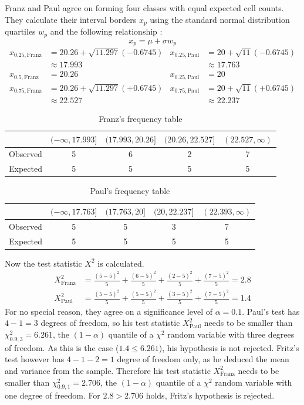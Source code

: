\documentclass{article}
\begin{document}
Franz and Paul agree on forming four classes with equal expected cell counts.
They calculate their interval borders $x_p$ using the standard normal distribution quartiles $w_p$ and the following relationship \cite{conover1980practical}:
\begin{equation*}
	x_p = \mu + \sigma w_p
\end{equation*}
%
\begin{align*}
	x_{0.25, \text{Franz}} &= 20.26 + \sqrt{11.297}(-0.6745) & x_{0.25, \text{Paul}} &= 20 + \sqrt{11}(-0.6745) \\
	&\approx 17.993 & &\approx 17.763 \\[1ex]
	x_{0.5, \text{Franz}} &= 20.26 & x_{0.25, \text{Paul}} &= 20 \\[1ex]
	x_{0.75, \text{Franz}} &= 20.26 + \sqrt{11.297}(+0.6745) & x_{0.75, \text{Paul}} &= 20 + \sqrt{11}(+0.6745) \\
	&\approx 22.527 & &\approx 22.237
\end{align*}
%
\begin{table}[h]
\center
\caption{Franz's frequency table}
\begin{tabular}{l|cccc}
	& $(-\infty, 17.993]$ & $(17.993, 20.26]$ & $(20.26, 22.527]$ & $(22.527,\infty)$ \\
	\hline
	Observed & 5 & 6 & 2 & 7 \\
	Expected & 5 & 5 & 5 & 5 \\
\end{tabular}
\end{table}
\begin{table}[h]
\center
\caption{Paul's frequency table}
\begin{tabular}{l|cccc}
	& $(-\infty, 17.763]$ & $(17.763, 20]$ & $(20, 22.237]$ & $(22.393,\infty)$ \\
	\hline
	Observed & 5 & 5 & 3 & 7 \\
	Expected & 5 & 5 & 5 & 5 \\
\end{tabular}
\end{table}
Now the test statistic $X^2$ is calculated.
\begin{align*}
	X^2_{\text{Franz}} &= \frac{(5-5)^2}{5} + \frac{(6-5)^2}{5} + \frac{(2-5)^2}{5} + \frac{(7-5)^2}{5} = 2.8
	\\[1ex]
	X^2_{\text{Paul}} &= \frac{(5-5)^2}{5} + \frac{(5-5)^2}{5} + \frac{(3-5)^2}{5} + \frac{(7-5)^2}{5} = 1.4
\end{align*}
%
For no special reason, they agree on a significance level of $\alpha = 0.1$.
Paul's test has $4-1=3$ degrees of freedom, so his test statistic $X^2_{\text{Paul}}$ needs to be smaller than $\chi^2_{0.9, 3} = 6.261$, the $(1-\alpha)$ quantile of a $\chi^2$ random variable with three degrees of freedom.
As this is the case ($1.4 \leq 6.261$), his hypothesis is not rejected.
Fritz's test however has $4-1-2=1$ degree of freedom only, as he deduced the mean and variance from the sample.
Therefore his test statistic $X^2_{\text{Franz}}$ needs to be smaller than $\chi^2_{0.9, 1} = 2.706$, the $(1-\alpha)$ quantile of a $\chi^2$ random variable with one degree of freedom.
For $2.8 > 2.706$ holds, Fritz's hypothesis is rejected.
\end{document}
